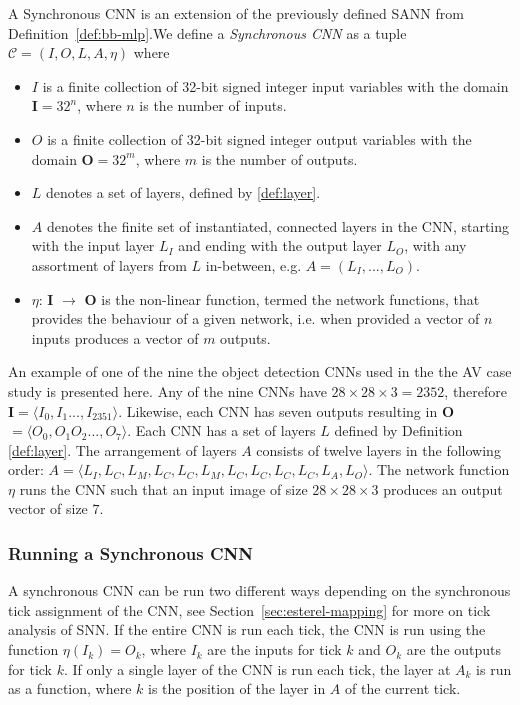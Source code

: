 \begin{definition}
	\label{def:cnn}
	A Synchronous \ac{CNN} is an extension of the previously defined \ac{SANN} from Definition~\ref{def:bb-mlp}.We define a \emph{Synchronous \ac{CNN}} as a tuple $\mathcal{C} = (I, O, L, A, \eta)$ where
	\begin{itemize}
		\item $I$ is a finite collection of 32-bit signed integer input variables with the domain \textbf{I}$ = 32^n$, where $n$ is the number of inputs.
		\item $O$ is a finite collection of 32-bit signed integer output variables with the domain \textbf{O}$ = 32^m$, where $m$ is the number of outputs.
		\item $L$ denotes a set of layers, defined by \ref{def:layer}.
		\item $A$ denotes the finite set of instantiated, connected layers in the \ac{CNN}, starting with the input layer $L_I$ and ending with the output layer $L_O$, with any assortment of layers from $L$ in-between, e.g. $A = (L_I, ..., L_O)$.
		\item $\eta$: \textbf{I} $\rightarrow$ \textbf{O} is the non-linear function, termed the network functions, that provides the behaviour of a given network, i.e. when provided a vector of $n$ inputs produces a vector of $m$ outputs. 
	\end{itemize}
\end{definition}

\begin{example}
	\label{ex:cnn}
	An example of one of the nine the object detection \acp{CNN} used in the the \ac{AV} case study is presented here.
	Any of the nine \acp{CNN} have $28 \times 28 \times 3 = 2352$, therefore \textbf{I}$ = \langle I_0, I_1 ..., I_2351 \rangle$.
	Likewise, each CNN has seven outputs resulting in \textbf{O}$ = \langle O_0, O_1 O_2 ..., O_7 \rangle$.
	Each \ac{CNN} has a set of layers $L$ defined by Definition \ref{def:layer}.
	The arrangement of layers $A$ consists of twelve layers in the following order: $A = \langle L_I, L_C, L_M, L_C, L_C, L_M, L_C, L_C, L_C, L_C, L_A, L_O \rangle$.
	The network function $\eta$ runs the \ac{CNN} such that an input image of size $28 \times 28 \times 3$ produces an output vector of size $7$.
\end{example}

\subsubsection{Running a Synchronous CNN}
A synchronous CNN can be run two different ways depending on the synchronous tick assignment of the CNN, see Section~\ref{sec:esterel-mapping} for more on tick analysis of \ac{SNN}. 
If the entire CNN is run each tick, the CNN is run using the function $\eta(I_k) = O_k$, where $I_k$ are the inputs for tick $k$ and $O_k$ are the outputs for tick $k$.
If only a single layer of the CNN is run each tick, the layer at $A_k$ is run as a function, where $k$ is the position of the layer in $A$ of the current tick.


